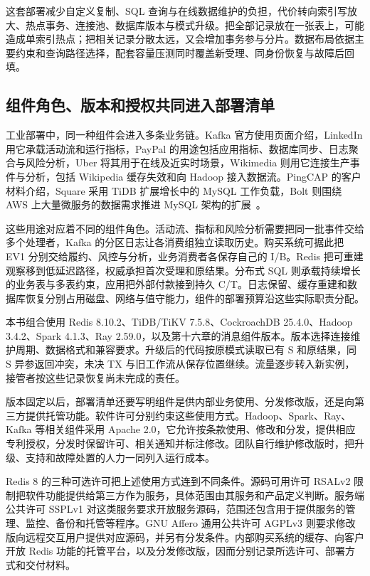 这套部署减少自定义复制、SQL 查询与在线数据维护的负担，代价转向索引写放大、热点事务、连接池、数据库版本与模式升级。把全部记录放在一张表上，可能造成单索引热点；把相关记录分散太远，又会增加事务参与分片。数据布局依据主要约束和查询路径选择，配套容量压测同时覆盖新受理、同身份恢复与故障后回填。

\subsection{组件角色、版本和授权共同进入部署清单}

工业部署中，同一种组件会进入多条业务链。Kafka 官方使用页面介绍，LinkedIn 用它承载活动流和运行指标，PayPal 的用途包括应用指标、数据库同步、日志聚合与风险分析，Uber 将其用于在线及近实时场景，Wikimedia 则用它连接生产事件与分析，包括 Wikipedia 缓存失效和向 Hadoop 接入数据流。PingCAP 的客户材料介绍，Square 采用 TiDB 扩展增长中的 MySQL 工作负载，Bolt 则围绕 AWS 上大量微服务的数据需求推进 MySQL 架构的扩展~\cite{ch21-kafka-adoption,ch21-tidb-adoption}。

这些用途对应着不同的组件角色。活动流、指标和风险分析需要把同一批事件交给多个处理者，Kafka 的分区日志让各消费组独立读取历史。购买系统可据此把 EV1 分别交给履约、风控与分析，业务消费者各保存自己的 I/B。Redis 把可重建观察移到低延迟路径，权威承担首次受理和原结果。分布式 SQL 则承载持续增长的业务表与多表约束，应用把外部付款接到持久 C/T。日志保留、缓存重建和数据库恢复分别占用磁盘、网络与值守能力，组件的部署预算沿这些实际职责分配。

本书组合使用 Redis 8.10.2、TiDB/TiKV 7.5.8、CockroachDB 25.4.0、Hadoop 3.4.2、Spark 4.1.3、Ray 2.59.0，以及第十六章的消息组件版本。版本选择连接维护周期、数据格式和兼容要求。升级后的代码按原模式读取已有 S 和原结果，同 S 异参返回冲突，未决 TX 与旧工作流从保存位置继续。流量逐步转入新实例，接管者按这些记录恢复尚未完成的责任。

版本固定以后，部署清单还要写明组件是供内部业务使用、分发修改版，还是向第三方提供托管功能。软件许可分别约束这些使用方式。Hadoop、Spark、Ray、Kafka 等相关组件采用 Apache 2.0，它允许按条款使用、修改和分发，提供相应专利授权，分发时保留许可、相关通知并标注修改。团队自行维护修改版时，把升级、支持和故障处置的人力一同列入运行成本。

Redis 8 的三种可选许可把上述使用方式连到不同条件。源码可用许可 RSALv2 限制把软件功能提供给第三方作为服务，具体范围由其服务和产品定义判断。服务端公共许可 SSPLv1 对这类服务要求开放服务源码，范围还包含用于提供服务的管理、监控、备份和托管等程序。GNU Affero 通用公共许可 AGPLv3 则要求修改版向远程交互用户提供对应源码，并另有分发条件。内部购买系统的缓存、向客户开放 Redis 功能的托管平台，以及分发修改版，因而分别记录所选许可、部署方式和交付材料。

